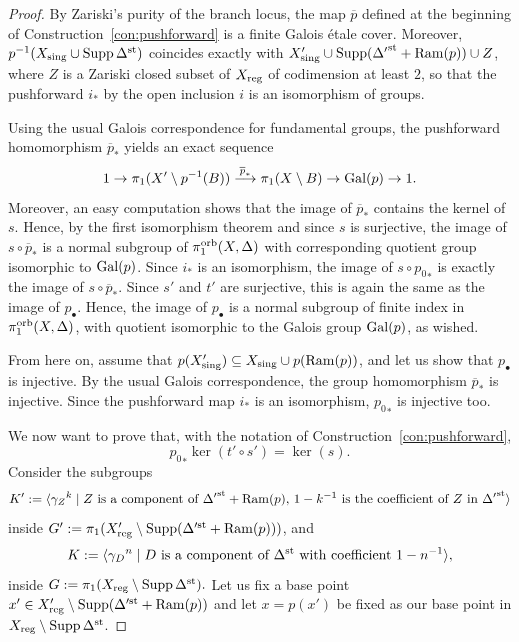\documentclass{amsart}
\theoremstyle{definition}
\theoremstyle{remark}
\numberwithin{equation}{section}
\begin{document}
\begin{proof}
By Zariski's purity of the branch locus, the map $\overline{p}$ defined at the beginning of Construction~\ref{con:pushforward} is a finite Galois étale cover. Moreover, $p^{-1}(X_{\rm sing}\cup{\rm Supp}\,\Delta^{\rm st})$ coincides exactly with $X'_{\rm sing}\cup{\rm Supp}({\Delta'}^{\rm st}+{\rm Ram}(p))\cup Z$, where $Z$ is a Zariski closed subset of $X_{\rm reg}$ of codimension at least $2$, so that the pushforward $i_*$ by the open inclusion $i$ is an isomorphism of groups.

Using the usual Galois correspondence for fundamental groups, the pushforward homomorphism $\overline{p}_*$ yields an exact sequence
$$1\to\pi_1(X'\setminus p^{-1}(B))\overset{\overline{p}_*}{\longrightarrow}\pi_1(X\setminus B)\to {\rm Gal}(p)\to 1.$$
Moreover, an easy computation shows that the image of $\overline{p}_*$ contains the kernel of $s$. Hence, by the first isomorphism theorem and since $s$ is surjective,
the image of $s\circ\overline{p}_*$ is a normal subgroup of $\pi_1^{\rm orb}(X,\Delta)$ with corresponding quotient group isomorphic to ${\rm Gal}(p)$.
Since $i_*$ is an isomorphism, the image of $s\circ {p_0}_*$ is exactly the image of $s\circ\overline{p}_*$. Since $s'$ and $t'$ are surjective, this is again the same as the image of $p_{\bullet}$. Hence, the image of $p_{\bullet}$ is a normal subgroup of finite index in $\pi_1^{\rm orb}(X,\Delta)$, with quotient isomorphic to the Galois group ${\rm Gal}(p)$, as wished.


\medskip

From here on, assume that $p(X'_{\rm sing})\subseteq X_{\rm sing}\cup p({\rm Ram}(p))$, and let us show that $p_{\bullet}$ is injective. By the usual Galois correspondence, the group homomorphism $\overline{p}_*$ is injective.  
Since the pushforward map $i_*$ is an isomorphism, ${p_0}_*$ is injective too.

We now want to prove that, with the notation of Construction~\ref{con:pushforward},
$${p_0}_*\ker(t'\circ s')=\ker(s).$$
Consider the subgroups
$$K':=\langle {\gamma_Z}^k\mid Z\mbox{ is a component of }{\Delta'}^{\rm st}+{\rm Ram}(p),\, 1-k^{-1} \mbox{ is the coefficient of }Z\mbox{ in }{\Delta'}^{\rm st}\rangle$$
inside $G':=\pi_1(X'_{\rm reg}\setminus {\rm Supp}(\Delta'^{\rm st}+{\rm Ram}(p)))$, and
$$K:=\langle {\gamma_D}^n\mid D\mbox{ is a component of }\Delta^{\rm st}\mbox{ with coefficient }1-n^{-1}\rangle,$$
inside $G:=\pi_1(X_{\rm reg}\setminus {\rm Supp}\,\Delta^{\rm st}).$ 
Let us fix a base point $x'\in X'_{\rm reg}\setminus {\rm Supp}(\Delta'^{\rm st}+{\rm Ram}(p))$ and let $x=p(x')$ be fixed as our base point in $X_{\rm reg}\setminus {\rm Supp}\,\Delta^{\rm st}$.



\end{proof}
\end{document}
